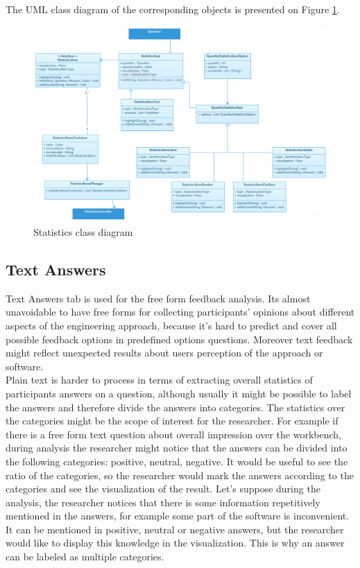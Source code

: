 The UML class diagram of the corresponding objects is presented on Figure \ref{fig:statistics_class_diagram}.\\
 
 \begin{figure}[htb]
 \centering
\includegraphics[width=\textwidth]{figures/statistics_class_diagram.jpg}
\caption{Statistics class diagram}
\label{fig:statistics_class_diagram}
 \end{figure}


 
 \subsection{Text Answers}
Text Answers tab is used for the free form feedback analysis. Its almost unavoidable to have free forms for collecting participants' opinions about different aspects of the engineering approach, because it's hard to predict and cover all possible feedback options in predefined options questions. Moreover text feedback might reflect unexpected results about users perception of the approach or software.\\

Plain text is harder to process in terms of extracting overall statistics of participants answers on a question, although usually it might be possible to label the answers and therefore divide the answers into categories. The statistics over the categories might be the scope of interest for the researcher. For example if there is a free form text question about overall impression over the workbench, during analysis the researcher might notice that the answers can be divided into the following categories: positive, neutral, negative. It would be useful to see the ratio of the categories, so the researcher would mark the answers according to the categories and see the visualization of the result. Let's suppose during the analysis, the researcher notices that there is some information repetitively mentioned in the answers, for example some part of the software is inconvenient. It can be mentioned in positive, neutral or negative answers, but the researcher would like to display this knowledge in the visualization. This is why an answer can be labeled as multiple categories.\\

